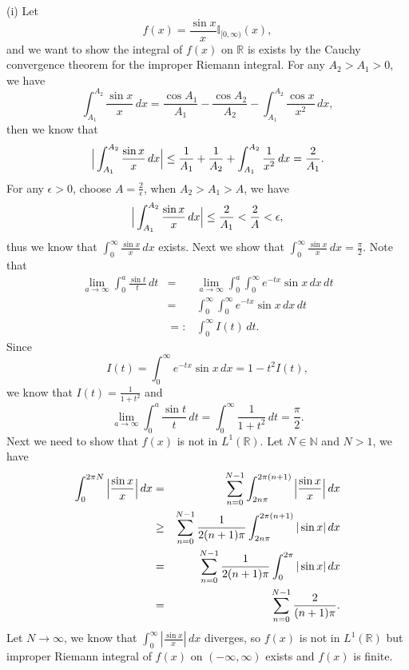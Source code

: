 \documentclass[12pt,a4paper]{ctexart}
\begin{document}
(i) Let
\begin{equation*}
    f(x) = \frac{\sin x}{x} \mathbb{I}_{[0, \infty)} (x),
\end{equation*}
and we want to show the integral of $f(x)$ on $\mathbb{R}$ is exists by the Cauchy convergence theorem for the improper Riemann integral. For any $A_{2} > A_{1} > 0$, we have
\begin{equation*}
    \int_{A_{1}}^{A_{2}} \frac{\sin x}{x} \, d x = \frac{\cos A_{1}}{A_{1}} - \frac{\cos A_{2}}{A_{2}} - \int_{A_{1}}^{A_{2}} \frac{\cos x}{x^{2}} \, d x,
\end{equation*}
then we know that
\begin{equation*}
    \Big{|} \int_{A_{1}}^{A_{2}} \frac{\sin x}{x} \, d x \Big{|} \leq \frac{1}{A_{1}} + \frac{1}{A_{2}} + \int_{A_{1}}^{A_{2}} \frac{1}{x^{2}} \, d x = \frac{2}{A_{1}}.
\end{equation*}
For any $\epsilon > 0$, choose $A = \frac{2}{\epsilon}$, when $A_{2} > A_{1} > A$, we have
\begin{equation*}
    \Big{|} \int_{A_{1}}^{A_{2}} \frac{\sin x}{x} \, d x \Big{|} \leq \frac{2}{A_{1}} < \frac{2}{A} < \epsilon,
\end{equation*} 
thus we know that $\int_{0}^{\infty} \frac{\sin x}{x} \, d x$ exists. Next we show that $\int_{0}^{\infty} \frac{\sin x}{x} \, d x = \frac{\pi}{2}$. Note that
\begin{eqnarray*}
    \lim_{a \to \infty} \int_{0}^{a} \frac{\sin t}{t} \, d t & = & \lim_{a \to \infty} \int_{0}^{a} \int_{0}^{\infty} e^{- t x} \sin x \, d x \, d t \\
    & = & \int_{0}^{\infty} \int_{0}^{\infty} e^{- t x} \sin x \, d x \, d t  \\
    & =: & \int_{0}^{\infty} I(t) \, d t.
\end{eqnarray*}
Since
\begin{equation*}
    I(t) = \int_{0}^{\infty} e^{- t x} \sin x \, d x = 1 - t^{2} I(t),
\end{equation*}
we know that $I(t) = \frac{1}{1+ t^{2}}$ and
\begin{equation*}
    \lim_{a \to \infty} \int_{0}^{a} \frac{\sin t}{t} \, d t = \int_{0}^{\infty} \frac{1}{1+ t^{2}} \, d t = \frac{\pi}{2}.
\end{equation*}
Next we need to show that $f(x)$ is not in $L^{1}(\mathbb{R})$. Let $N \in \mathbb{N}$ and $N > 1$, we have
\begin{eqnarray*}
    \int_{0}^{2 \pi N} \Big{|} \frac{\sin x}{x} \Big{|} \, d x & = & \sum_{n=0}^{N-1} \int_{2n \pi}^{2 \pi (n+1)} \Big{|} \frac{\sin x}{x} \Big{|} \, d x  \\
    & \geq & \sum_{n=0}^{N-1} \frac{1}{2(n+1) \pi} \int_{2n \pi}^{2 \pi (n+1)} |\sin x| \, d x \\
    & = & \sum_{n=0}^{N-1} \frac{1}{2(n+1) \pi} \int_{0}^{2 \pi} |\sin x| \, d x \\
    & = & \sum_{n=0}^{N-1} \frac{2}{(n+1) \pi}.
\end{eqnarray*}
Let $N \to \infty$, we know that $\int_{0}^{\infty} |\frac{\sin x}{x}| \, d x $ diverges, so $f(x)$ is not in $L^{1}(\mathbb{R})$ but improper Riemann integral of $f(x)$ on $(-\infty, \infty)$ exists and $f(x)$ is finite.
\end{document}
